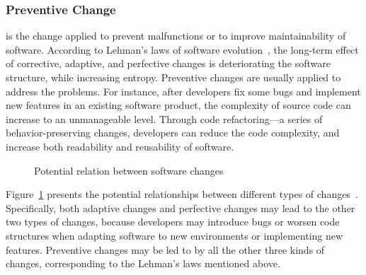 \documentclass[runningheads,a4paper]{llncs}
\begin{document}
\subsubsection{Preventive Change} is the change applied to prevent malfunctions or to improve maintainability of software. 
According to Lehman's laws of software evolution~\cite{Lehman1984:ULE}, the long-term effect of corrective, adaptive, and perfective changes is deteriorating the software structure, while increasing entropy. Preventive changes are usually applied to address the problems. For instance, after developers fix some bugs and implement new features in an existing software product, the complexity of source code can increase to an unmanageable level. Through code refactoring---a series of behavior-preserving changes, developers can reduce the code complexity, and increase both readability and reusability of software.
\begin{figure}[!htb]
\centering
{}
\caption{Potential relation between software changes~\cite{Seaman2008:SMC}}
\label{fig:relation}
\end{figure}

Figure~\ref{fig:relation} presents the potential relationships between different types of changes~\cite{Seaman2008:SMC}. Specifically, both adaptive changes and perfective changes may lead to the other two types of changes, because developers may introduce bugs or worsen code structures when adapting software to new environments or implementing new features. Preventive changes may be led to by all the other three kinds of changes, corresponding to the Lehman's laws mentioned above.
\end{document}
